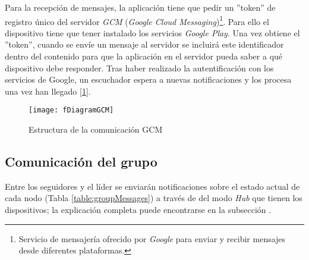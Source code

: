 Para la recepción de mensajes, la aplicación tiene que pedir un ''token'' de registro
único del servidor \emph{GCM} (\emph{Google Cloud Messaging})\footnote{Servicio
de mensajería ofrecido por \emph{Google} para enviar y recibir mensajes desde
diferentes plataformas.}. Para ello el dispositivo tiene que tener instalado los
servicios \emph{Google Play}. Una vez obtiene el ''token'', cuando se envíe un
mensaje al servidor se incluirá este identificador dentro del contenido para que
la aplicación en el servidor pueda saber a qué dispositivo debe responder. Tras
haber realizado la autentificación con los servicios de Google, un escuchador
espera a nuevas notificaciones y los procesa una vez han llegado [\ref{figure:DiagramGCM}].
\begin{figure}[h]
	\texttt{[image: fDiagramGCM]}
	\caption{Estructura de la comunicación GCM}
	\label{figure:DiagramGCM}
\end{figure}

\subsection{Comunicación del grupo}\label{ssection:comunicacion_grupo}
Entre los seguidores y el líder se enviarán notificaciones sobre el estado actual
de cada nodo (Tabla \ref{table:groupMessages}) a través de del modo \emph{Hub}
que tienen los dispositivos; la explicación completa puede encontrarse en la
subsección    .


